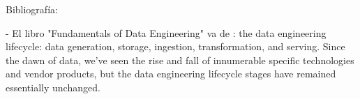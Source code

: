 \documentclass[12pt]{book}
\begin{document}
Bibliografía: 

- El libro "Fundamentals of Data Engineering" va de : the data engineering lifecycle: data generation, storage, ingestion, transformation, and serving. Since the dawn of data, we've seen the rise and fall of innumerable specific technologies and vendor products, but the data engineering lifecycle stages have remained essentially unchanged. 
\end{document}
